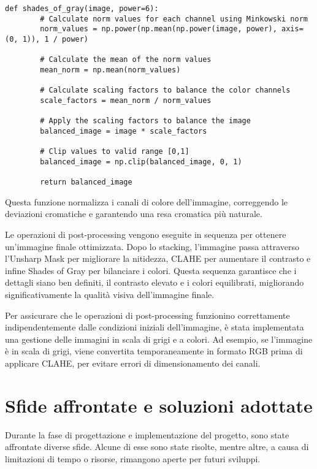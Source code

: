 \begin{lstlisting}[label={lst:color_balance}]
    def shades_of_gray(image, power=6):
        # Calculate norm values for each channel using Minkowski norm
        norm_values = np.power(np.mean(np.power(image, power), axis=(0, 1)), 1 / power)
        
        # Calculate the mean of the norm values
        mean_norm = np.mean(norm_values)
        
        # Calculate scaling factors to balance the color channels
        scale_factors = mean_norm / norm_values
        
        # Apply the scaling factors to balance the image
        balanced_image = image * scale_factors
        
        # Clip values to valid range [0,1]
        balanced_image = np.clip(balanced_image, 0, 1)

        return balanced_image 
\end{lstlisting}

Questa funzione normalizza i canali di colore dell'immagine, correggendo le deviazioni cromatiche e garantendo una resa cromatica più naturale.

Le operazioni di post-processing vengono eseguite in sequenza per ottenere un'immagine finale ottimizzata. Dopo lo stacking, l'immagine passa attraverso l'Unsharp Mask per migliorare la nitidezza, CLAHE per aumentare il contrasto e infine Shades of Gray per bilanciare i colori. Questa sequenza garantisce che i dettagli siano ben definiti, il contrasto elevato e i colori equilibrati, migliorando significativamente la qualità visiva dell'immagine finale.

Per assicurare che le operazioni di post-processing funzionino correttamente indipendentemente dalle condizioni iniziali dell'immagine, è stata implementata una gestione delle immagini in scala di grigi e a colori. Ad esempio, se l'immagine è in scala di grigi, viene convertita temporaneamente in formato RGB prima di applicare CLAHE, per evitare errori di dimensionamento dei canali.

\section{Sfide affrontate e soluzioni adottate} \label{sec:challenges}

Durante la fase di progettazione e implementazione del progetto, sono state affrontate diverse sfide. Alcune di esse sono state risolte, mentre altre, a causa di limitazioni di tempo o risorse, rimangono aperte per futuri sviluppi.


